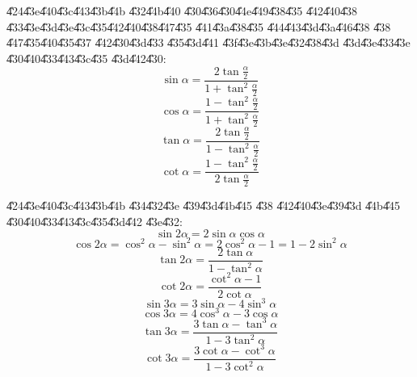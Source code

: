\documentclass{article}
\begin{document}
\U{424}\U{43e}\U{440}\U{43c}\U{443}\U{43b}\U{44b} \U{432}\U{44b}\U{440}%
\U{430}\U{436}\U{430}\U{44e}\U{449}\U{438}\U{435} \U{442}\U{440}\U{438}%
\U{433}\U{43e}\U{43d}\U{43e}\U{43c}\U{435}\U{442}\U{440}\U{438}\U{447}\U{435}%
\U{441}\U{43a}\U{438}\U{435} \U{444}\U{443}\U{43d}\U{43a}\U{446}\U{438}%
\U{438} \U{447}\U{435}\U{440}\U{435}\U{437} \U{442}\U{430}\U{43d}\U{433}%
\U{435}\U{43d}\U{441} \U{43f}\U{43e}\U{43b}\U{43e}\U{432}\U{438}\U{43d}%
\U{43d}\U{43e}\U{433}\U{43e} \U{430}\U{440}\U{433}\U{443}\U{43c}\U{435}%
\U{43d}\U{442}\U{430}:%
\[
\sin \alpha =\frac{2\tan \frac{\alpha }{2}}{1+\tan ^{2}\frac{\alpha }{2}} 
\]%
\[
\cos \alpha =\frac{1-\tan ^{2}\frac{\alpha }{2}}{1+\tan ^{2}\frac{\alpha }{2}%
} 
\]%
\[
\tan \alpha =\frac{2\tan \frac{\alpha }{2}}{1-\tan ^{2}\frac{\alpha }{2}} 
\]%
\[
\cot \alpha =\frac{1-\tan ^{2}\frac{\alpha }{2}}{2\tan \frac{\alpha }{2}} 
\]

\U{424}\U{43e}\U{440}\U{43c}\U{443}\U{43b}\U{44b} \U{434}\U{432}\U{43e}%
\U{439}\U{43d}\U{44b}\U{445} \U{438} \U{442}\U{440}\U{43e}\U{439}\U{43d}%
\U{44b}\U{445} \U{430}\U{440}\U{433}\U{443}\U{43c}\U{435}\U{43d}\U{442}%
\U{43e}\U{432}:%
\[
\sin 2\alpha =2\sin \alpha \cos \alpha 
\]%
\[
\cos 2\alpha =\cos ^{2}\alpha -\sin ^{2}\alpha =2\cos ^{2}\alpha -1=1-2\sin
^{2}\alpha 
\]%
\[
\tan 2\alpha =\frac{2\tan \alpha }{1-\tan ^{2}\alpha }
\]%
\[
\cot 2\alpha =\frac{\cot ^{2}\alpha -1}{2\cot \alpha }
\]%
\[
\sin 3\alpha =3\sin \alpha -4\sin ^{3}\alpha 
\]%
\[
\cos 3\alpha =4\cos ^{3}\alpha -3\cos \alpha 
\]%
\[
\tan 3\alpha =\frac{3\tan \alpha -\tan ^{3}\alpha }{1-3\tan ^{2}\alpha }
\]%
\[
\cot 3\alpha =\frac{3\cot \alpha -\cot ^{3}\alpha }{1-3\cot ^{2}\alpha }
\]
\end{document}
